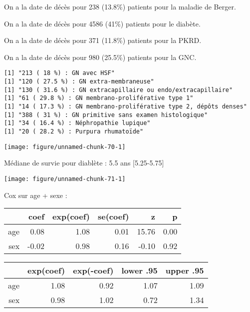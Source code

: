 \documentclass[11pt,a4paper]{article}\usepackage[]{graphicx}\usepackage[]{color}
\makeatletter
\def\maxwidth{ %
  \ifdim\Gin@nat@width>\linewidth
    \linewidth
  \else
    \Gin@nat@width
  \fi
}
\newenvironment{kframe}{%
 \def\at@end@of@kframe{}%
 \ifinner\ifhmode%
  \def\at@end@of@kframe{\end{minipage}}%
  \begin{minipage}{\columnwidth}%
 \fi\fi%
 \def\FrameCommand##1{\hskip\@totalleftmargin \hskip-\fboxsep
 \colorbox{shadecolor}{##1}\hskip-\fboxsep
     \hskip-\linewidth \hskip-\@totalleftmargin \hskip\columnwidth}%
 \MakeFramed {\advance\hsize-\width
   \@totalleftmargin\z@ \linewidth\hsize
   \@setminipage}}%
 {\par\unskip\endMakeFramed%
 \at@end@of@kframe}
\newenvironment{knitrout}{}{} %
\makeatother
\begin{document}
  On a la date de décès pour 238 (13.8\%) patients pour la maladie de Berger.
  
  On a la date de décès pour 4586 (41\%) patients pour le diabète.
  
  On a la date de décès pour 371 (11.8\%) patients pour la PKRD.
  
  On a la date de décès pour 980 (25.5\%) patients pour la GNC.

\begin{knitrout}
\color{fgcolor}\begin{kframe}
\begin{verbatim}
[1] "213 ( 18 %) : GN avec HSF"
[1] "120 ( 27.5 %) : GN extra-membraneuse"
[1] "130 ( 31.6 %) : GN extracapillaire ou endo/extracapillaire"
[1] "61 ( 29.8 %) : GN membrano-proliférative type 1"
[1] "14 ( 17.3 %) : GN membrano-proliférative type 2, dépôts denses"
[1] "388 ( 31 %) : GN primitive sans examen histologique"
[1] "34 ( 16.4 %) : Néphropathie lupique"
[1] "20 ( 28.2 %) : Purpura rhumatoïde"
\end{verbatim}
\end{kframe}
\end{knitrout}


\begin{knitrout}
\color{fgcolor}
\texttt{[image: figure/unnamed-chunk-70-1]} 

\end{knitrout}

Médiane de survie pour diablète : 5.5 ans [5.25-5.75]

\begin{knitrout}
\color{fgcolor}
\texttt{[image: figure/unnamed-chunk-71-1]} 

\end{knitrout}

Cox sur age + sexe :
\begin{table}[H]
\centering
\begin{tabular}{rrrrrr}
  \hline
 & coef & exp(coef) & se(coef) & z & p \\ 
  \hline
age & 0.08 & 1.08 & 0.01 & 15.76 & 0.00 \\ 
  sex & -0.02 & 0.98 & 0.16 & -0.10 & 0.92 \\ 
   \hline
\end{tabular}
\end{table}
\begin{table}[H]
\centering
\begin{tabular}{rrrrr}
  \hline
 & exp(coef) & exp(-coef) & lower .95 & upper .95 \\ 
  \hline
age & 1.08 & 0.92 & 1.07 & 1.09 \\ 
  sex & 0.98 & 1.02 & 0.72 & 1.34 \\ 
   \hline
\end{tabular}
\end{table}
\end{document}
